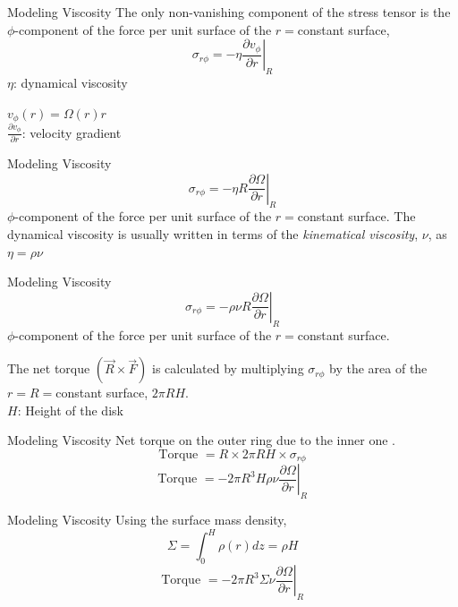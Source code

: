 \documentclass{beamer}
\begin{document}
\begin{frame}{Modeling Viscosity}
	The only non-vanishing component of the stress tensor is the $\phi$-component of the force per unit surface of the $r=$constant surface,  
	\[\sigma_{r\phi} = -\eta \left. \frac{\partial v_\phi}{\partial r} \right|_R \]
	\pause
	$\eta$: dynamical viscosity\\
	\bigskip
	
	$v_\phi (r) = \Omega (r) r$\\
	$\frac{\partial v_\phi}{\partial r}$: velocity gradient
\end{frame}

\begin{frame}{Modeling Viscosity}
	\[\sigma_{r\phi} = -\eta R \left. \frac{\partial \Omega}{\partial r} \right|_R \]
	$\phi$-component of the force per unit surface of the $r=$constant surface.
	\pause
	The dynamical viscosity is usually written in terms of the \textit{kinematical viscosity}, $\nu$, as $\eta = \rho \nu$\\
\end{frame}



\begin{frame}{Modeling Viscosity}
	\[\sigma_{r\phi} = -\rho \nu R \left. \frac{\partial \Omega}{\partial r} \right|_R \]
	$\phi$-component of the force per unit surface of the $r=$constant surface.\\
	\bigskip
	\pause
	
	The net torque $(\vec{R}\times \vec{F} )$ is calculated by multiplying $\sigma_{r\phi} $ by the area of the $r=R=$constant surface, $ 2\pi R H $.\\
	\pause
	$H$: Height of the disk
\end{frame}

\begin{frame}{Modeling Viscosity}
	Net torque on the outer ring due to the inner one	.
	\pause
	\[ \textrm{Torque } = R \times 2\pi R H \times \sigma_{r\phi} \] 
	\pause
	\[\textrm{Torque } = -2 \pi R^3 H \rho \nu  \left. \frac{\partial \Omega}{\partial r} \right|_R \]
\end{frame}

\begin{frame}{Modeling Viscosity}
	Using the surface mass density, 
	\pause
	\[ \Sigma = \int_0^H \rho(r) dz = \rho H \] 
	\pause
	\[\textrm{Torque } = -2 \pi R^3 \Sigma \nu  \left. \frac{\partial \Omega}{\partial r} \right|_R \]
\end{frame}
\end{document}
